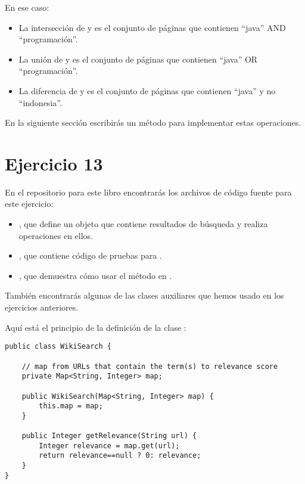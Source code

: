 \documentclass[12pt]{book}
\theoremstyle{exercise}
\begin{document}
En ese caso:

\begin{itemize}

\item
  La intersección de  y  es el conjunto de páginas
  que contienen ``java'' AND ``programación''.

\item
  La unión de  y  es el conjunto de páginas que
  contienen ``java'' OR ``programación''.

\item
  La diferencia de  y  es el conjunto de páginas que
  contienen ``java'' y no ``indonesia''.
\end{itemize}

En la siguiente sección escribirás un método para implementar estas operaciones.



\section{Ejercicio 13}
\label{exercise13}

En el repositorio para este libro
encontrarás los archivos de código fuente para este ejercicio:

\begin{itemize}

\item
  , que define un objeto que contiene resultados de
  búsqueda y realiza operaciones en ellos.

\item
  , que contiene código de pruebas para
  .

\item
  , que demuestra cómo usar el método 
  en .

\end{itemize}

También encontrarás algunas de las clases auxiliares que hemos usado en
los ejercicios anteriores.


Aquí está el principio de la definición de la clase :

\begin{verbatim}
public class WikiSearch {

    // map from URLs that contain the term(s) to relevance score
    private Map<String, Integer> map;

    public WikiSearch(Map<String, Integer> map) {
        this.map = map;
    }

    public Integer getRelevance(String url) {
        Integer relevance = map.get(url);
        return relevance==null ? 0: relevance;
    }
}
\end{verbatim}
\end{document}
